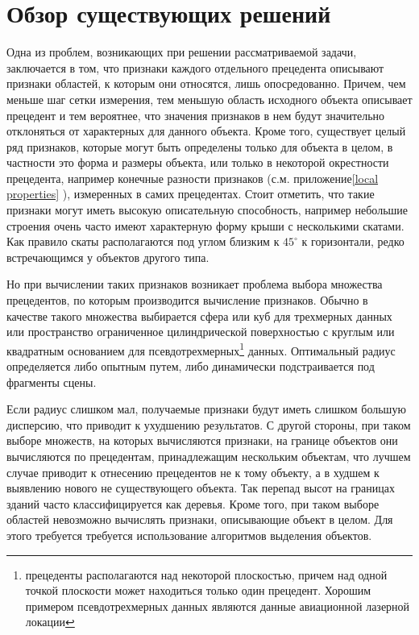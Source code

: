 \newpage
\section{Обзор существующих решений}
\label{review}

Одна из проблем, возникающих при решении рассматриваемой задачи, заключается в том, что признаки каждого отдельного прецедента описывают признаки областей, к которым они относятся, лишь опосредованно. Причем, чем меньше шаг сетки измерения, тем меньшую область исходного объекта описывает прецедент и тем вероятнее, что значения признаков в нем будут значительно отклоняться от характерных для данного объекта. Кроме того, существует целый ряд признаков, которые могут быть определены только для объекта в целом, в частности это форма и размеры объекта, или только в некоторой окрестности прецедента, например конечные разности признаков (с.м. приложение\ref{local properties} ), измеренных в самих прецедентах. Стоит отметить, что такие признаки могут иметь высокую описательную способность, например небольшие строения очень часто имеют характерную форму крыши с несколькими скатами. Как правило скаты располагаются под углом близким к $45^\circ$ к горизонтали, редко встречающимся у объектов другого типа\cite{full waveform}.

Но при вычислении таких признаков возникает проблема выбора множества прецедентов, по которым производится вычисление признаков. Обычно в качестве такого множества выбирается сфера или куб для трехмерных данных или пространство ограниченное цилиндрической поверхностью с круглым или квадратным основанием для псевдотрехмерных\footnote{прецеденты располагаются над некоторой плоскостью, причем над одной точкой плоскости может находиться только один прецедент. Хорошим примером псевдотрехмерных данных являются данные авиационной лазерной локации} данных. Оптимальный радиус определяется либо опытным путем, либо динамически подстраивается под фрагменты сцены\cite{SMAP}.

Если радиус слишком мал, получаемые признаки будут иметь слишком большую дисперсию, что приводит к ухудшению результатов. С другой стороны, при таком выборе множеств, на которых вычисляются признаки, на границе объектов они вычисляются по прецедентам, принадлежащим нескольким объектам, что лучшем случае приводит к отнесению прецедентов не к тому объекту, а в худшем к выявлению нового не существующего объекта. Так перепад высот на границах зданий часто классифицируется как деревья\cite{full waveform}. Кроме того, при таком выборе областей невозможно вычислять признаки, описывающие объект в целом. Для этого требуется требуется использование алгоритмов выделения объектов. 

